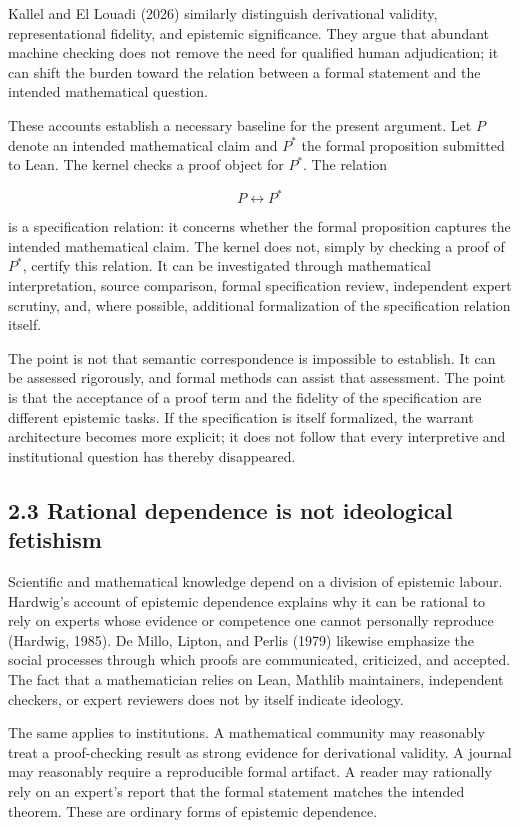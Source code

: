 \documentclass[sn-apa]{sn-jnl}
\begin{document}
Kallel and El Louadi (2026) similarly distinguish derivational validity, representational fidelity, and epistemic significance. They argue that abundant machine checking does not remove the need for qualified human adjudication; it can shift the burden toward the relation between a formal statement and the intended mathematical question.

These accounts establish a necessary baseline for the present argument. Let \(P\) denote an intended mathematical claim and \(P^*\) the formal proposition submitted to Lean. The kernel checks a proof object for \(P^*\). The relation

\[
P \longleftrightarrow P^*
\]


is a specification relation: it concerns whether the formal proposition captures the intended mathematical claim. The kernel does not, simply by checking a proof of \(P^*\), certify this relation. It can be investigated through mathematical interpretation, source comparison, formal specification review, independent expert scrutiny, and, where possible, additional formalization of the specification relation itself.

The point is not that semantic correspondence is impossible to establish. It can be assessed rigorously, and formal methods can assist that assessment. The point is that the acceptance of a proof term and the fidelity of the specification are different epistemic tasks. If the specification is itself formalized, the warrant architecture becomes more explicit; it does not follow that every interpretive and institutional question has thereby disappeared.

\subsection{2.3 Rational dependence is not ideological fetishism}

Scientific and mathematical knowledge depend on a division of epistemic labour. Hardwig’s account of epistemic dependence explains why it can be rational to rely on experts whose evidence or competence one cannot personally reproduce (Hardwig, 1985). De Millo, Lipton, and Perlis (1979) likewise emphasize the social processes through which proofs are communicated, criticized, and accepted. The fact that a mathematician relies on Lean, Mathlib maintainers, independent checkers, or expert reviewers does not by itself indicate ideology.

The same applies to institutions. A mathematical community may reasonably treat a proof-checking result as strong evidence for derivational validity. A journal may reasonably require a reproducible formal artifact. A reader may rationally rely on an expert’s report that the formal statement matches the intended theorem. These are ordinary forms of epistemic dependence.
\end{document}
